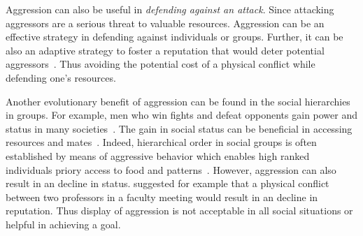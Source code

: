 \documentclass[../header.tex]{subfiles}
\begin{document}
Aggression can also be useful in \textit{defending against an attack}.
Since attacking aggressors are a serious threat to valuable resources.
Aggression can be an effective strategy in defending against individuals or groups.
Further, it can be also an adaptive strategy to foster a reputation that would deter potential aggressors~\cite{Buss1997}.
Thus avoiding the potential cost of a physical conflict while defending one's resources.

Another evolutionary benefit of aggression can be found in the social hierarchies in groups.
For example, men who win fights and defeat opponents gain power and status in many societies~\cite{Hill1996}.
The gain in social status can be beneficial in accessing resources and mates~\cite{Archer2009}.
Indeed, hierarchical order in social groups is often established by means of aggressive behavior which enables high ranked individuals priory access to food and patterns~\cite{Lindenfors2011}. 
However, aggression can also result in an decline in status.
\citet{Buss1997} suggested for example that a physical conflict between two professors in a faculty meeting would result in an decline in reputation.
Thus display of aggression is not acceptable in all social situations or helpful in achieving a goal.
\end{document}
